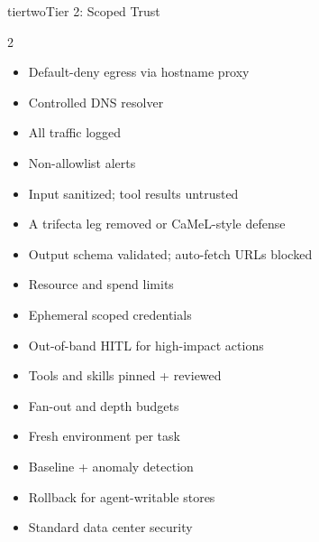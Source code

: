 \documentclass[11pt,letterpaper]{article}
\begin{document}
\begin{checkbox}{tiertwo}{Tier 2: Scoped Trust}
\small
\begin{multicols}{2}
\begin{itemize}[leftmargin=1.4em, itemsep=0.15em]
  \item[{\color{tiertwo!80!black}$\square$}] Default-deny egress via hostname proxy
  \item[{\color{tiertwo!80!black}$\square$}] Controlled DNS resolver
  \item[{\color{tiertwo!80!black}$\square$}] All traffic logged
  \item[{\color{tiertwo!80!black}$\square$}] Non-allowlist alerts
  \item[{\color{tiertwo!80!black}$\square$}] Input sanitized; tool results untrusted
  \item[{\color{tiertwo!80!black}$\square$}] A trifecta leg removed or CaMeL-style defense
  \item[{\color{tiertwo!80!black}$\square$}] Output schema validated; auto-fetch URLs blocked
  \item[{\color{tiertwo!80!black}$\square$}] Resource and spend limits
  \item[{\color{tiertwo!80!black}$\square$}] Ephemeral scoped credentials
  \item[{\color{tiertwo!80!black}$\square$}] Out-of-band HITL for high-impact actions
  \item[{\color{tiertwo!80!black}$\square$}] Tools and skills pinned + reviewed
  \item[{\color{tiertwo!80!black}$\square$}] Fan-out and depth budgets
  \item[{\color{tiertwo!80!black}$\square$}] Fresh environment per task
  \item[{\color{tiertwo!80!black}$\square$}] Baseline + anomaly detection
  \item[{\color{tiertwo!80!black}$\square$}] Rollback for agent-writable stores
  \item[{\color{tiertwo!80!black}$\square$}] Standard data center security
\end{itemize}
\end{multicols}
\end{checkbox}
\end{document}
